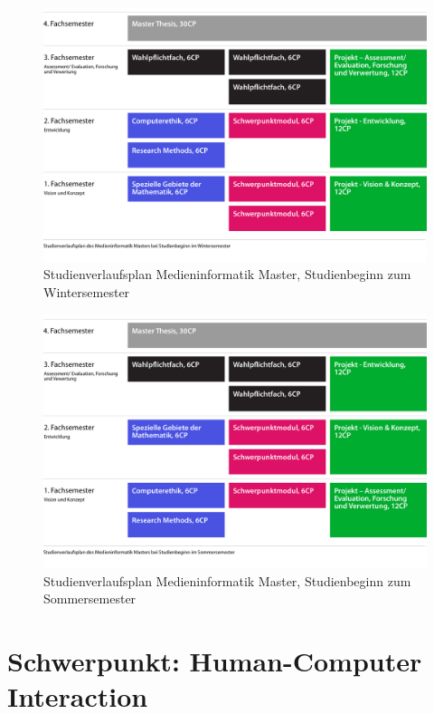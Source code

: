 \begin{figure}[htbp]
\centering
\includegraphics[width=\textwidth]{../anhaenge/bilder/ws-small.png}
\caption{Studienverlaufsplan Medieninformatik Master, Studienbeginn zum
Wintersemester}
\end{figure}

\begin{figure}[htbp]
\centering
\includegraphics[width=\textwidth]{../anhaenge/bilder/ss-small.png}
\caption{Studienverlaufsplan Medieninformatik Master, Studienbeginn zum
Sommersemester}
\end{figure}

\chapter{Schwerpunkt: Human-Computer
Interaction\label{/mi-2017/modulbeschreibungen-master/schwerpunkt-human-computer-interaction}}\label{schwerpunkt-human-computer-interactionpathlabelmi-2017modulbeschreibungen-masterschwerpunkt-human-computer-interaction}


